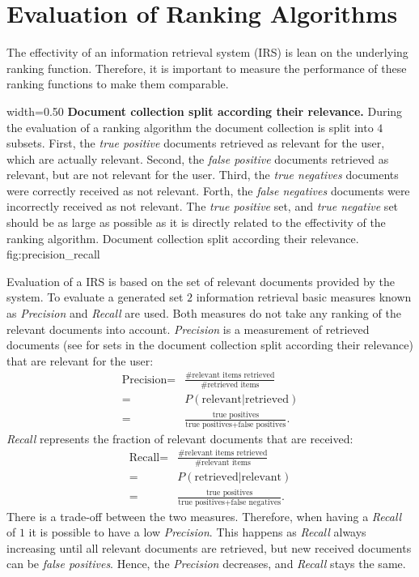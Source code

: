 \section{Evaluation of Ranking Algorithms}
\label{sec:evaluation_of_ranking_algorithms}

The effectivity of an information retrieval system (IRS) is lean on the underlying ranking function. Therefore, it is important to measure the performance of these ranking functions to make them comparable.

      {width=0.50\textwidth}
      {\textbf{Document collection split according their relevance.} During the evaluation of a ranking algorithm the document collection is split into $4$ subsets. First, the \textit{true positive} documents retrieved as relevant for the user, which are actually relevant. Second, the \textit{false positive} documents retrieved as relevant, but are not relevant for the user. Third, the \textit{true negatives} documents were correctly received as not relevant. Forth, the \textit{false negatives} documents were incorrectly received as not relevant. The \textit{true positive} set, and \textit{true negative} set should be as large as possible as it is directly related to the effectivity of the ranking algorithm.}
      {Document collection split according their relevance.}
      {fig:precision_recall}

Evaluation of a IRS is based on the set of relevant documents provided by the system. To evaluate a generated set $2$ information retrieval basic measures known as \textit{Precision} and \textit{Recall} are used. Both measures do not take any ranking of the relevant documents into account. \textit{Precision} is a measurement of retrieved documents (see  for sets in the document collection split according their relevance) that are relevant for the user:
\begin{align}
  \label{precision}
  \text{Precision} = & \frac{\text{\# relevant items retrieved}}{\text{\# retrieved items}} \nonumber \\
    = & P(\text{relevant} | \text{retrieved}) \nonumber \\
    = & \frac{\text{true positives}}{\text{true positives} + \text{false positives}}.
\end{align}
\textit{Recall} represents the fraction of relevant documents that are received:
\begin{align}
  \text{Recall} = & \frac{\text{\# relevant items retrieved}}{\text{\# relevant items}} \nonumber \\
    = & P(\text{retrieved} | \text{relevant}) \nonumber \\
    = & \frac{\text{true positives}}{\text{true positives} + \text{false negatives}}.
\end{align}
There is a trade-off between the two measures. Therefore, when having a \textit{Recall} of $1$ it is possible to have a low \textit{Precision}. This happens as \textit{Recall} always increasing until all relevant documents are retrieved, but new received documents can be \textit{false positives}. Hence, the \textit{Precision} decreases, and \textit{Recall} stays the same.

